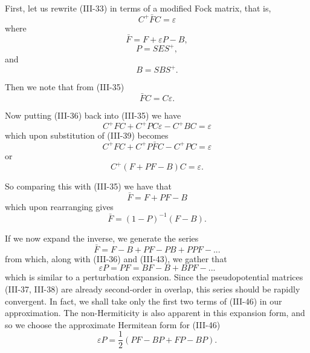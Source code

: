 \documentclass[12pt,letterpaper]{report}
\begin{document}
First, let us rewrite (III-33) in terms of a modified Fock matrix, that is,
\begin{equation}
C^+ \bar{F} C = \varepsilon
\end{equation}
where
\begin{equation}
\bar{F} = F + \varepsilon P - B,
\end{equation}
\begin{equation}
P = SES^+,
\end{equation}
and
\begin{equation}
B = SBS^+.
\end{equation}

Then we note that from (III-35)
\begin{equation}
\bar{F}C = C\varepsilon.
\end{equation}

Now putting (III-36) back into (III-35) we have
\begin{equation}
C^+ FC + C^+ PC\varepsilon - C^+ BC = \varepsilon
\end{equation}
which upon substitution of (III-39) becomes
\begin{equation}
C^+ FC + C^+ P\bar{F}C - C^+ PC = \varepsilon
\end{equation}
or
\begin{equation}
C^+(F + PF - B)C = \varepsilon.
\end{equation}

So comparing this with (III-35) we have that
\begin{equation}
\bar{F} = F + PF - B
\end{equation}
which upon rearranging gives
\begin{equation}
\bar{F} = (1 - P)^{-1}(F - B).
\end{equation}

If we now expand the inverse, we generate the series
\begin{equation}
\bar{F} = F - B + PF - PB + PPF - ...
\end{equation}
from which, along with (III-36) and (III-43), we gather that
\begin{equation}
\varepsilon P = PF = BF - B + BPF - ...
\end{equation}
which is similar to a perturbation expansion. Since the pseudopotential matrices (III-37, III-38) are already second-order in overlap, this series should be rapidly convergent. In fact, we shall take only the first two terms of (III-46) in our approximation. The non-Hermiticity is also apparent in this expansion form, and so we choose the approximate Hermitean form for (III-46)
\begin{equation}
\varepsilon P = \frac{1}{2}(PF - BP + FP - BP).
\end{equation}
\end{document}
